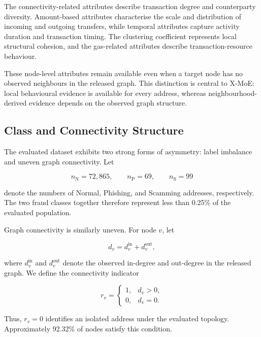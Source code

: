 \documentclass{ieeeaccess}
\begin{document}
The connectivity-related attributes describe transaction degree and counterparty diversity. Amount-based attributes characterise the scale and distribution of incoming and outgoing transfers, while temporal attributes capture activity duration and transaction timing. The clustering coefficient represents local structural cohesion, and the gas-related attributes describe transaction-resource behaviour.

These node-level attributes remain available even when a target node has no observed neighbours in the released graph. This distinction is central to X-MoE: local behavioural evidence is available for every address, whereas neighbourhood-derived evidence depends on the observed graph structure.

\subsection{Class and Connectivity Structure}

The evaluated dataset exhibits two strong forms of asymmetry: label imbalance and uneven graph connectivity. Let

\begin{equation}
n_{\mathrm{N}}=72{,}865,\qquad
n_{\mathrm{P}}=69,\qquad
n_{\mathrm{S}}=99
\end{equation}

denote the numbers of Normal, Phishing, and Scamming addresses, respectively. The two fraud classes together therefore represent less than 0.25\% of the evaluated population.

Graph connectivity is similarly uneven. For node $v$, let

\begin{equation}
d_v = d_v^{\mathrm{in}} + d_v^{\mathrm{out}},
\end{equation}

where $d_v^{\mathrm{in}}$ and $d_v^{\mathrm{out}}$ denote the observed in-degree and out-degree in the released graph. We define the connectivity indicator

\begin{equation}
r_v=
\begin{cases}
1, & d_v>0,\\
0, & d_v=0.
\end{cases}
\label{eq:connectivity_indicator}
\end{equation}

Thus, $r_v=0$ identifies an isolated address under the evaluated topology. Approximately 92.32\% of nodes satisfy this condition.
\end{document}
